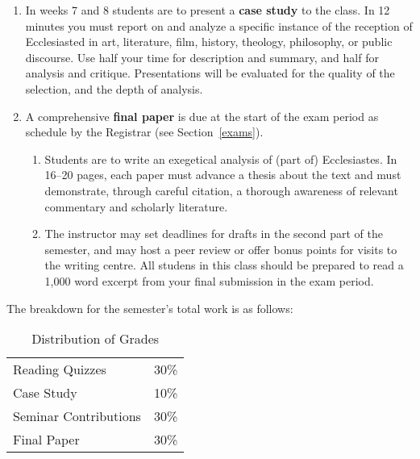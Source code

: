 \documentclass[titlepage]{article}
\begin{document}
\begin{enumerate}
\begin{enumerate}
	\end{enumerate}

	\item In weeks 7 and 8 students are to present a \textbf{case study}
	to the class. In 12 minutes you must report on and analyze a
	specific instance of the reception of Ecclesiasted in art,
	literature, film, history, theology, philosophy, or public
	discourse. Use half your time for description and summary, and half
	for analysis and critique. Presentations will be evaluated for the
	quality of the selection, and the depth of analysis.

	\item A comprehensive \textbf{final paper} is due at the start of
	the exam period as schedule by the Registrar (see
	Section~\ref{exams}).

	\begin{enumerate}

		\item Students are to write an exegetical analysis of (part of)
		Ecclesiastes. In 16--20 pages, each paper must advance a thesis
		about the text and must demonstrate, through careful citation, a
		thorough awareness of relevant commentary and scholarly
		literature.

		\item The instructor may set deadlines for drafts in the second
		part of the semester, and may host a peer review or offer bonus
		points for visits to the writing centre. All studens in this
		class should be prepared to read a 1,000 word excerpt from your
		final submission in the exam period.

	\end{enumerate}

\end{enumerate}

The breakdown for the semester's total work is as follows:

\begin{table}[htbp]
  \centering
  {\lining
  \begin{tabular}{lr}
    \toprule
    Reading Quizzes        & 30\% \\
    Case Study             & 10\% \\
    Seminar Contributions  & 30\% \\
    Final Paper            & 30\% \\
    \bottomrule
  \end{tabular}}
  \caption{Distribution of Grades}
  \label{distribution}
\end{table}
\end{document}
